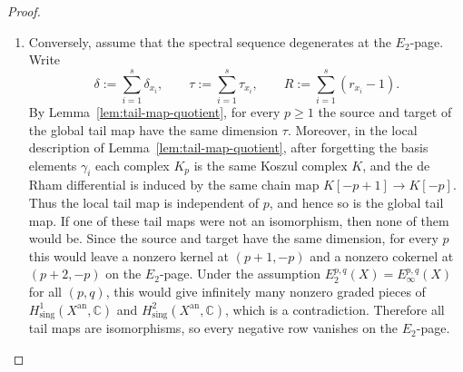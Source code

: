 \documentclass[12pt,reqno]{amsart}
\begin{document}
\begin{proof}
\begin{enumerate}
\[
E_2^{0,0}(X),\qquad
E_2^{1,0}(X),\qquad
E_2^{0,1}(X),\qquad
E_2^{1,1}(X).
\]
Explicitly, the \(E_2\)-page is supported in the positions \((0,0)\), \((1,0)\), \((0,1)\), and \((1,1)\), and has the form
\[
\begin{tikzcd}[row sep=tiny, column sep=small]
\scriptstyle q=1 & E_2^{0,1}(X) & E_2^{1,1}(X) & 0
\\
\scriptstyle q=0 & E_2^{0,0}(X) & E_2^{1,0}(X) & 0
\\
\scriptstyle q=-1 & 0 & 0 & 0
\end{tikzcd}
\]
Any differential \(d_r\) with \(r\ge 2\) has bidegree \((r,1-r)\), so no such differential can start or end at one of these four positions. Hence \(E_2^{p,q}(X)=E_\infty^{p,q}(X)\) for all \((p,q)\).

\item
Conversely, assume that the spectral sequence degenerates at the \(E_2\)-page. Write
\[
\delta:=\sum_{i=1}^s\delta_{x_i},
\qquad
\tau:=\sum_{i=1}^s\tau_{x_i},
\qquad
R:=\sum_{i=1}^s(r_{x_i}-1).
\]
By Lemma~\ref{lem:tail-map-quotient}, for every \(p\ge 1\) the source and target of the global tail map have the same dimension \(\tau\). Moreover, in the local description of Lemma~\ref{lem:tail-map-quotient}, after forgetting the basis elements \(\gamma_i\) each complex \(K_p\) is the same Koszul complex \(K\), and the de Rham differential is induced by the same chain map \(K[-p+1]\to K[-p]\). Thus the local tail map is independent of \(p\), and hence so is the global tail map. If one of these tail maps were not an isomorphism, then none of them would be. Since the source and target have the same dimension, for every \(p\) this would leave a nonzero kernel at \((p+1,-p)\) and a nonzero cokernel at \((p+2,-p)\) on the \(E_2\)-page. Under the assumption \(E_2^{p,q}(X)=E_\infty^{p,q}(X)\) for all \((p,q)\), this would give infinitely many nonzero graded pieces of \(H^1_{\mathrm{sing}}(X^{\mathrm{an}},\mathbb C)\) and \(H^2_{\mathrm{sing}}(X^{\mathrm{an}},\mathbb C)\), which is a contradiction. Therefore all tail maps are isomorphisms, so every negative row vanishes on the \(E_2\)-page.


\end{enumerate}
\end{proof}
\end{document}
